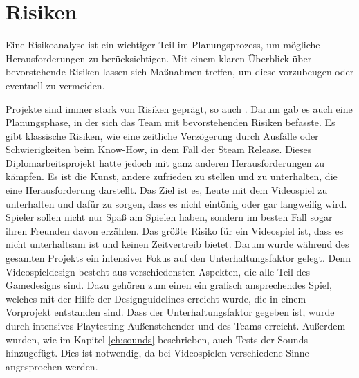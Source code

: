 
\section{Risiken}\label{sec:risiken}

\renewcommand{\kapitelautor}{Autor: Nils Hubmann}
%
Eine Risikoanalyse ist ein wichtiger Teil im Planungsprozess, um mögliche Herausforderungen zu berücksichtigen.
Mit einem klaren Überblick über bevorstehende Risiken lassen sich Maßnahmen treffen, um diese vorzubeugen oder eventuell zu vermeiden.

Projekte sind immer stark von Risiken geprägt, so auch \ff.
Darum gab es auch eine Planungsphase, in der sich das Team mit bevorstehenden Risiken befasste.
Es gibt klassische Risiken, wie eine zeitliche Verzögerung durch Ausfälle oder Schwierigkeiten beim Know-How, in dem Fall der Steam Release.
Dieses Diplomarbeitsprojekt hatte jedoch mit ganz anderen Herausforderungen zu kämpfen.
Es ist die Kunst, andere zufrieden zu stellen und zu unterhalten, die eine Herausforderung darstellt.
Das Ziel ist es, Leute mit dem Videospiel zu unterhalten und dafür zu sorgen, dass es nicht eintönig oder gar langweilig wird.
Spieler sollen nicht nur Spaß am Spielen haben, sondern im besten Fall sogar ihren Freunden davon erzählen.
Das größte Risiko für ein Videospiel ist, dass es nicht unterhaltsam ist und keinen Zeitvertreib bietet.
Darum wurde während des gesamten Projekts ein intensiver Fokus auf den Unterhaltungsfaktor gelegt.
Denn Videospieldesign besteht aus verschiedensten Aspekten, die alle Teil des Gamedesigns sind.
Dazu gehören zum einen ein grafisch ansprechendes Spiel, welches mit der Hilfe der Designguidelines erreicht wurde, die in einem Vorprojekt entstanden sind.
Dass der Unterhaltungsfaktor gegeben ist, wurde durch intensives Playtesting Außenstehender und des Teams erreicht.
Außerdem wurden, wie im Kapitel \ref{ch:sounds} beschrieben, auch Tests der Sounds hinzugefügt.
Dies ist notwendig, da bei Videospielen verschiedene Sinne angesprochen werden.
%

\renewcommand{\kapitelautor}{}
